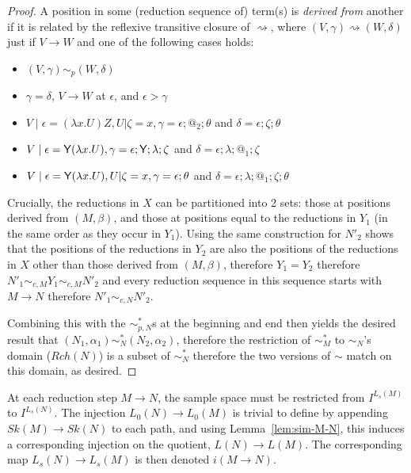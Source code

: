 \begin{proof}
A position in some (reduction sequence of) term(s) is \emph{derived from} another if it is related by the reflexive transitive closure of $\rightsquigarrow$, where $(V,\gamma) \rightsquigarrow (W,\delta)$ just if $V \to W$ and one of the following cases holds:
\begin{itemize}
    \item $(V,\gamma) \sim_p (W,\delta)$
    \item $\gamma = \delta$, $V \to W$ at $\epsilon$, and $\epsilon > \gamma$
    \item $V \mid \epsilon = (\lambda x.U) Z, U | \zeta = x, \gamma = \epsilon;@_2;\theta$ and $\delta = \epsilon;\zeta;\theta$
    \item $V \mid \epsilon = \mathsf{Y} (\lambda x.U), \gamma = \epsilon;\mathsf{Y};\lambda;\zeta$ and $\delta = \epsilon;\lambda;@_1;\zeta$
    \item $V \mid \epsilon = \mathsf{Y} (\lambda x.U), U | \zeta = x, \gamma = \epsilon;\theta$ and $\delta = \epsilon;\lambda;@_1;\zeta;\theta$
\end{itemize}

Crucially, the reductions in $X$ can be partitioned into 2 sets: those at positions derived from $(M,\beta)$, and those at positions equal to the reductions in $Y_1$ (in the same order as they occur in $Y_1$). Using the same construction for $N'_2$ shows that the positions of the reductions in $Y_2$ are also the positions of the reductions in $X$ other than those derived from $(M,\beta)$, therefore $Y_1 = Y_2$ therefore $N'_1 \sim_{c,M} Y_1 \sim_{c,M} N'_2$ and every reduction sequence in this sequence starts with $M \to N$ therefore $N'_1 \sim_{c,N} N'_2$.

Combining this with the $\sim_{p,N}^*$s at the beginning and end then yields the desired result that $(N_1,\alpha_1) \sim_N^* (N_2, \alpha_2)$, therefore the restriction of $\sim_M^*$ to $\sim_N$'s domain ($Rch(N)$) is a subset of $\sim_N^*$ therefore the two versions of $\sim$ match on this domain, as desired.
\end{proof}


At each reduction step $M \to N$, the sample space must be restricted from $I^{L_s(M)}$ to $I^{L_s(N)}$. 
The injection $L_0(N) \to L_0(M)$ is trivial to define by appending $Sk(M) \to Sk(N)$ to each path, and using Lemma~\ref{lem:sim-M-N}, this induces a corresponding injection on the quotient, $L(N) \to L(M)$. 
The corresponding map $L_s(N) \to L_s(M)$ is then denoted $i(M \to N)$.

